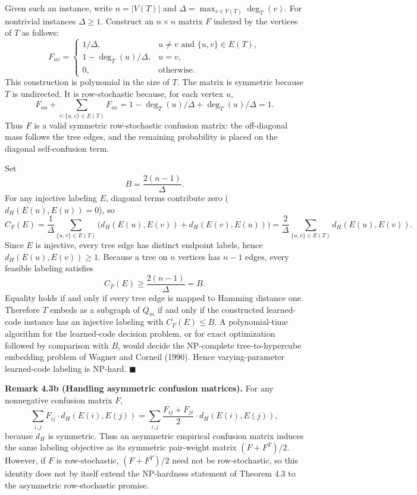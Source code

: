 \documentclass[
]{article}
\begin{document}
Given such an instance, write $n = |V(T)|$ and
$\Delta = \max_{v \in V(T)} \deg_T(v)$. For nontrivial instances
$\Delta \geq 1$. Construct an $n \times n$ matrix $F$ indexed by the
vertices of $T$ as follows:
\[
F_{uv} =
\begin{cases}
1/\Delta, & u \neq v \text{ and } \{u, v\} \in E(T), \\
1 - \deg_T(u)/\Delta, & u = v, \\
0, & \text{otherwise.}
\end{cases}
\]
This construction is polynomial in the size of $T$. The matrix is
symmetric because $T$ is undirected. It is row-stochastic because, for
each vertex $u$,
\[
F_{uu} + \sum_{v : \{u, v\} \in E(T)} F_{uv}
= 1 - \deg_T(u)/\Delta + \deg_T(u)/\Delta = 1.
\]
Thus $F$ is a valid symmetric row-stochastic confusion matrix: the
off-diagonal mass follows the tree edges, and the remaining
probability is placed on the diagonal self-confusion term.

Set
\[
B = \frac{2(n - 1)}{\Delta}.
\]
For any injective labeling $E$, diagonal terms contribute zero
($d_H(E(u), E(u)) = 0$), so
\[
C_F(E) = \frac{1}{\Delta}
\sum_{\{u, v\} \in E(T)} \!\!\bigl(d_H(E(u), E(v)) + d_H(E(v), E(u))\bigr)
= \frac{2}{\Delta} \sum_{\{u, v\} \in E(T)} d_H(E(u), E(v)).
\]
Since $E$ is injective, every tree edge has distinct endpoint labels,
hence $d_H(E(u), E(v)) \geq 1$. Because a tree on $n$ vertices has
$n - 1$ edges, every feasible labeling satisfies
\[
C_F(E) \geq \frac{2(n - 1)}{\Delta} = B.
\]
Equality holds if and only if every tree edge is mapped to Hamming
distance one. Therefore $T$ embeds as a subgraph of $Q_m$ if and only
if the constructed learned-code instance has an injective labeling
with $C_F(E) \leq B$. A polynomial-time algorithm for the learned-code
decision problem, or for exact optimization followed by comparison
with $B$, would decide the NP-complete tree-to-hypercube embedding
problem of Wagner and Corneil (1990). Hence varying-parameter
learned-code labeling is NP-hard. \hfill$\blacksquare$

\textbf{Remark 4.3b (Handling asymmetric confusion matrices).} For any
nonnegative confusion matrix $F$,
\[
\sum_{i, j} F_{ij} \cdot d_H(E(i), E(j))
= \sum_{i, j} \frac{F_{ij} + F_{ji}}{2} \cdot d_H(E(i), E(j)),
\]
because $d_H$ is symmetric. Thus an asymmetric empirical confusion
matrix induces the same labeling objective as its symmetric pair-weight
matrix $(F + F^T)/2$. However, if $F$ is row-stochastic,
$(F + F^T)/2$ need not be row-stochastic, so this identity does not by
itself extend the NP-hardness statement of Theorem 4.3 to the
asymmetric row-stochastic promise.
\end{document}
